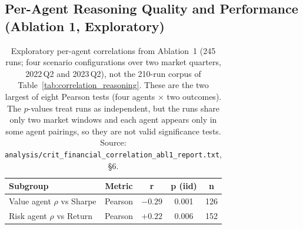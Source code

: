 \documentclass{article}
\begin{document}
\subsection{Per-Agent Reasoning Quality and Performance (Ablation 1, Exploratory)}
\label{app:correlation_betwen_agents}

\begin{table}[H]
\centering
\small
\begin{tabular}{lcccc}
\toprule
\textbf{Subgroup} & \textbf{Metric} & \textbf{r} & \textbf{p (iid)} & \textbf{n} \\
\midrule
Value agent $\rho$ vs Sharpe & Pearson & $-0.29$ & 0.001 & 126 \\
Risk agent $\rho$ vs Return & Pearson & $+0.22$ & 0.006 & 152 \\
\bottomrule
\end{tabular}
\vspace{4pt}
\caption{Exploratory per-agent correlations from Ablation~1 (245 runs; four scenario configurations over two market quarters, 2022\,Q2 and 2023\,Q2), not the 210-run corpus of Table~\ref{tab:correlation_reasoning}. These are the two largest of eight Pearson tests (four agents $\times$ two outcomes). The $p$-values treat runs as independent, but the runs share only two market windows and each agent appears only in some agent pairings, so they are not valid significance tests. Source: \texttt{analysis/crit\_financial\_correlation\_abl1\_report.txt}, \S6.}
\label{tab:subgroup_corr}
\end{table}
\end{document}

